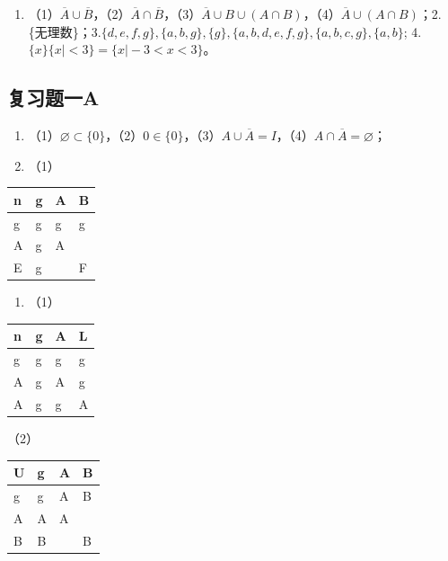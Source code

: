 \begin{enumerate}
\item
  （1）\(\overline{A} \cup \overline{B}\)，（2）\(\overline{A} \cap \overline{B}\)，（3）\(\overline{A} \cup B \cup (A \cap B)\)，（4）\(\overline{A} \cup (A \cap B)\)；2.
  \{无理数\}；3.\(\{d, e, f, g\}, \{a, b, g\}, \{g\}, \{a, b, d, e, f, g\}, \{a, b, c, g\}, \{a, b\}\);
  4. \(\{x\} \{x| < 3\} = \{x| - 3 < x < 3\}\)。
\end{enumerate}

\subsection{复习题一A}

\begin{enumerate}[start=2]
\item
  （1）\(\varnothing \subset \{0\}\)，（2）\(0 \in \{0\}\)，（3）\(A \cup \overline{A} = I\)，（4）\(A \cap \overline{A} = \varnothing\)；
\item
  （1）
\end{enumerate}

{\def\LTcaptype{none} %
\begin{longtable}[]{@{}llll@{}}
\toprule\noalign{}
n & g & A & B \\
\midrule\noalign{}
\endhead
\bottomrule\noalign{}
\endlastfoot
g & g & g & g \\
A & g & A & \\
E & g & & F \\
\end{longtable}
}

\begin{enumerate}[start=4]
\item
  （1）
\end{enumerate}

{\def\LTcaptype{none} %
\begin{longtable}[]{@{}llll@{}}
\toprule\noalign{}
n & g & A & L \\
\midrule\noalign{}
\endhead
\bottomrule\noalign{}
\endlastfoot
g & g & g & g \\
A & g & A & g \\
A & g & g & A \\
\end{longtable}
}

（2）

{\def\LTcaptype{none} %
\begin{longtable}[]{@{}llll@{}}
\toprule\noalign{}
U & g & A & B \\
\midrule\noalign{}
\endhead
\bottomrule\noalign{}
\endlastfoot
g & g & A & B \\
A & A & A & \\
B & B & & B \\
\end{longtable}
}

